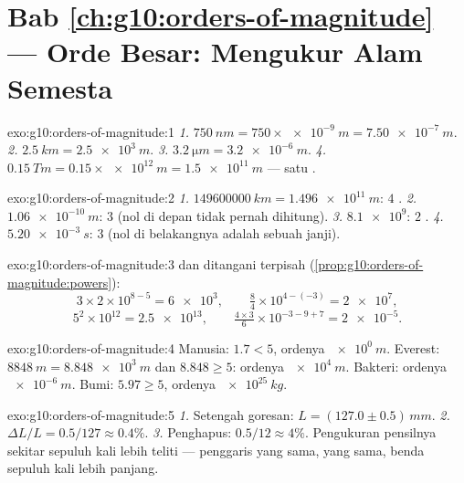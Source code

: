 \section*{Bab \ref{ch:g10:orders-of-magnitude} --- Orde Besar: Mengukur Alam Semesta}

\begin{solution}{exo:g10:orders-of-magnitude:1}
\emph{1.} $\qty{750}{nm} = 750 \times \qty{e-9}{m} = \qty{7.50e-7}{m}$.
\emph{2.} $\qty{2.5}{km} = \qty{2.5e3}{m}$.
\emph{3.} $\qty{3.2}{\micro m} = \qty{3.2e-6}{m}$.
\emph{4.} $\qty{0.15}{Tm} = 0.15 \times \qty{e12}{m} = \qty{1.5e11}{m}$
--- satu .
\end{solution}

\begin{solution}{exo:g10:orders-of-magnitude:2}
\emph{1.} $\qty{149600000}{km} = \qty{1.496e11}{m}$: $4$ .
\emph{2.} $\qty{1.06e-10}{m}$: $3$  (nol di depan tidak
pernah dihitung).
\emph{3.} $\num{8.1e9}$: $2$ .
\emph{4.} $\qty{5.20e-3}{s}$: $3$  (nol di belakangnya
adalah sebuah janji).
\end{solution}

\begin{solution}{exo:g10:orders-of-magnitude:3}
 dan  ditangani terpisah
(\cref{prop:g10:orders-of-magnitude:powers}):
\[
3 \times 2 \times 10^{8-5} = \num{6e3}, \qquad
\tfrac{8}{4} \times 10^{4-(-3)} = \num{2e7},
\]
\[
5^{2} \times 10^{12} = \num{2.5e13}, \qquad
\tfrac{4 \times 3}{6} \times 10^{-3-9+7} = \num{2e-5} .
\]
\end{solution}

\begin{solution}{exo:g10:orders-of-magnitude:4}
Manusia: $1.7 < 5$, ordenya $\qty{e0}{m}$. Everest:
$\qty{8848}{m} = \qty{8.848e3}{m}$ dan $8.848 \geq 5$: ordenya
$\qty{e4}{m}$. Bakteri: ordenya $\qty{e-6}{m}$. Bumi:
$5.97 \geq 5$, ordenya $\qty{e25}{kg}$.
\end{solution}

\begin{solution}{exo:g10:orders-of-magnitude:5}
\emph{1.} Setengah goresan: $L = (127.0 \pm 0.5)\,\unit{mm}$.
\emph{2.} $\Delta L / L = 0.5/127 \approx 0.4\%$.
\emph{3.} Penghapus: $0.5/12 \approx 4\%$. Pengukuran pensilnya
sekitar sepuluh kali lebih teliti --- penggaris yang sama,
 yang sama, benda sepuluh kali lebih panjang.
\end{solution}

